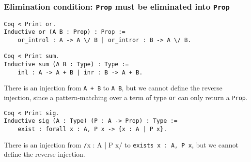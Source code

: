 \documentclass{beamer}
\begin{document}
\begin{frame}[fragile]
\frametitle{Elimination condition: \texttt{Prop} must be eliminated into \texttt{Prop}}

\begin{verbatim}
Coq < Print or.
Inductive or (A B : Prop) : Prop :=
    or_introl : A -> A \/ B | or_intror : B -> A \/ B.

Coq < Print sum.
Inductive sum (A B : Type) : Type :=
    inl : A -> A + B | inr : B -> A + B.
\end{verbatim}

There is an injection from \texttt{A + B} to \texttt{A \/ B},
but we cannot define the reverse injection, since a pattern-matching over a term
of type \texttt{or} can only return a \texttt{Prop}.

\begin{verbatim}
Coq < Print sig.
Inductive sig (A : Type) (P : A -> Prop) : Type :=
    exist : forall x : A, P x -> {x : A | P x}.
\end{verbatim}

There is an injection from \texttt/{x : A | P x}/ to
\texttt{exists x : A, P x}, but we cannot define the reverse injection.

\end{frame}
\end{document}
